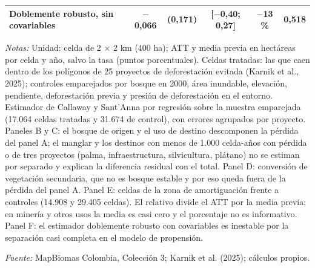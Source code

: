\begin{table}[htbp]
\begin{threeparttable}
\begin{tabular}{@{}lccccc@{}}
Doblemente robusto, sin covariables & $-$0,066 & (0,171) & [$-$0,40; 0,27] & $-$13 \% & 0,518 \\
\bottomrule
\end{tabular}
\begin{tablenotes}[flushleft]
\footnotesize
\item \textit{Notas:} Unidad: celda de 2 × 2 km (400 ha); ATT y media previa en hectáreas por celda y año, salvo la tasa (puntos porcentuales). Celdas tratadas: las que caen dentro de los polígonos de 25 proyectos de deforestación evitada (Karnik et al., 2025); controles emparejados por bosque en 2000, área inundable, elevación, pendiente, deforestación previa y presión de deforestación en el entorno. Estimador de Callaway y Sant’Anna por regresión sobre la muestra emparejada (17.064 celdas tratadas y 31.674 de control), con errores agrupados por proyecto. Paneles B y C: el bosque de origen y el uso de destino descomponen la pérdida del panel A; el manglar y los destinos con menos de 1.000 celda-años con pérdida o de tres proyectos (palma, infraestructura, silvicultura, plátano) no se estiman por separado y explican la diferencia residual con el total. Panel D: conversión de vegetación secundaria, que no es bosque estable y por eso queda fuera de la pérdida del panel A. Panel E: celdas de la zona de amortiguación frente a controles (14.908 y 29.405 celdas). El relativo divide el ATT por la media previa; en minería y otros usos la media es casi cero y el porcentaje no es informativo. Panel F: el estimador doblemente robusto con covariables es inestable por la separación casi completa en el modelo de propensión.
\item \textit{Fuente:} MapBiomas Colombia, Colección 3; Karnik et al. (2025); cálculos propios.
\end{tablenotes}
\end{threeparttable}
\end{table}
